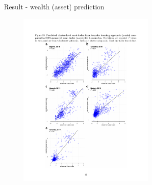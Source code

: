 \documentclass[mathserif]{beamer}
\begin{document}
\begin{frame}{Result - wealth (asset) prediction}

\begin{figure}
\includegraphics[width=0.6\textwidth]{jean_figS3}
\caption*{}
\end{figure}
\end{frame}
\end{document}
